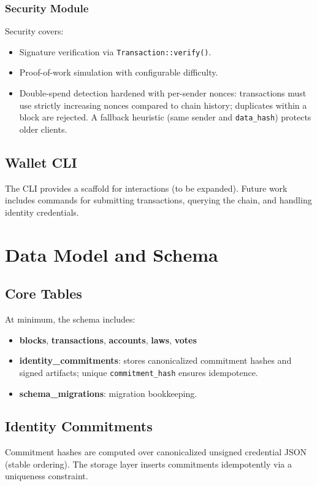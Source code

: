 \documentclass[12pt,a4paper]{report}
\begin{document}

\subsection{Security Module}
Security covers:
\begin{itemize}[noitemsep]
  \item Signature verification via \texttt{Transaction::verify()}.
  \item Proof-of-work simulation with configurable difficulty.
  \item Double-spend detection hardened with per-sender nonces: transactions must use strictly increasing nonces compared to chain history; duplicates within a block are rejected. A fallback heuristic (same sender and \texttt{data\_hash}) protects older clients.
\end{itemize}

\section{Wallet CLI}
The CLI provides a scaffold for interactions (to be expanded). Future work includes commands for submitting transactions, querying the chain, and handling identity credentials.

\chapter{Data Model and Schema}
\section{Core Tables}
At minimum, the schema includes:
\begin{itemize}[noitemsep]
  \item \textbf{blocks}, \textbf{transactions}, \textbf{accounts}, \textbf{laws}, \textbf{votes}
  \item \textbf{identity\_commitments}: stores canonicalized commitment hashes and signed artifacts; unique \texttt{commitment\_hash} ensures idempotence.
  \item \textbf{schema\_migrations}: migration bookkeeping.
\end{itemize}

\section{Identity Commitments}
Commitment hashes are computed over canonicalized unsigned credential JSON (stable ordering). The storage layer inserts commitments idempotently via a uniqueness constraint.
\end{document}
